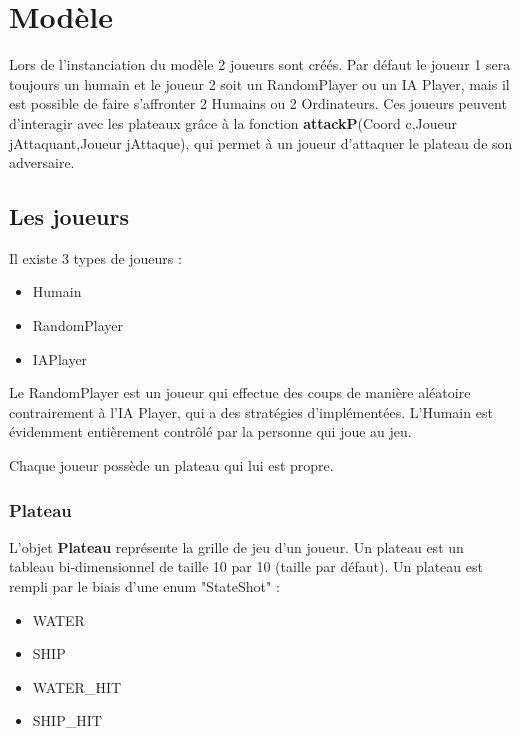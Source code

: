 
\section{Modèle}

\par Lors de l'instanciation du modèle 2 joueurs sont créés. Par défaut le joueur 1 sera toujours un humain et le joueur 2 soit un RandomPlayer ou un IA Player, mais il est possible de faire s'affronter 2 Humains ou 2 Ordinateurs. Ces joueurs peuvent d'interagir avec les plateaux grâce à la fonction \textbf{attackP}(Coord c,Joueur jAttaquant,Joueur jAttaque), qui permet à un joueur d'attaquer le plateau de son adversaire.

\subsection{Les joueurs}

Il existe 3 types de joueurs :
\\
\begin{itemize}
\item{Humain}
\item{RandomPlayer}
\item{IAPlayer}\\
\end{itemize}

\par Le RandomPlayer est un joueur qui effectue des coups de manière aléatoire contrairement à l'IA Player, qui a des stratégies d'implémentées. L'Humain est évidemment entièrement contrôlé par la personne qui joue au jeu.
\par Chaque joueur possède un plateau qui lui est propre.

\subsubsection{Plateau}

L'objet \textbf{Plateau} représente la grille de jeu d'un joueur. Un plateau est un tableau bi-dimensionnel de taille 10 par 10 (taille par défaut). Un plateau est rempli par le biais d'une enum "StateShot" :
\\
\begin{itemize}
\item{WATER}
\item{SHIP}
\item{WATER\_HIT}
\item{SHIP\_HIT}\\
\end{itemize}

